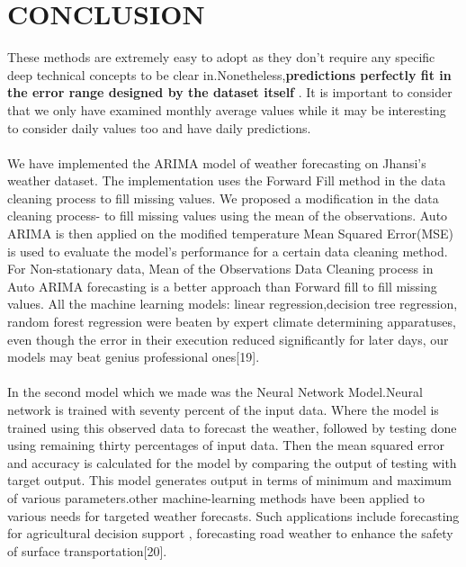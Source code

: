 \chapter{CONCLUSION}
These methods are extremely easy to adopt as they don’t require any specific deep technical concepts to be clear in.Nonetheless,\textbf{predictions perfectly fit in the error range designed by the dataset itself} . It is important to consider that we only have examined monthly average values while it may be interesting to consider daily values too and have daily predictions.
\\
\\
We have implemented the ARIMA model of weather forecasting on Jhansi’s weather dataset. The implementation uses the Forward Fill method in the data cleaning process to fill missing values. We proposed a modification in the data cleaning process- to fill missing values using the mean of the observations.  Auto ARIMA is then applied on the modified temperature Mean Squared Error(MSE) is used to evaluate the model's performance for a certain data cleaning method. For Non-stationary data, Mean of the Observations Data Cleaning process in Auto ARIMA forecasting is a better approach than Forward fill to fill missing values. All the machine learning models: linear regression,decision tree regression, random forest regression were beaten by expert climate determining apparatuses, even though the error in their execution reduced significantly for later days, our models may beat genius professional ones[19].
\\
\\
In the second model which we made was the Neural Network Model.Neural network is trained with seventy percent of the input data. Where the model is trained using this observed data to forecast the weather, followed by testing done using remaining thirty percentages of input data. Then the mean squared error and accuracy is calculated for the model by comparing the output of testing with target output. This model generates output in terms of minimum and maximum of various parameters.other machine-learning methods have been applied to various needs for targeted weather forecasts. Such applications include  forecasting for agricultural decision support , forecasting road weather to enhance the safety of surface transportation[20].